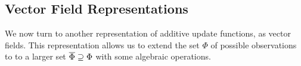 

% 


\subsection{Vector Field Representations}
\label{sec:vecrep}

We now turn to another representation of additive 
update functions, as vector fields. 
This representation allows us to extend the set $\Phi$ of possible observations to 
to a larger set $\overline \Phi \supseteq \Phi$ with some algebraic operations.  


